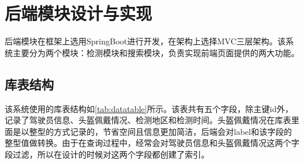 

\section{后端模块设计与实现}
后端模块在框架上选用SpringBoot进行开发，在架构上选择MVC三层架构。该系统主要分为两个模块：检测模块和搜索模块，负责实现前端页面提供的两大功能。

\subsection{库表结构}
该系统使用的库表结构如\ref{tab:datatable}所示。该表共有五个字段，除主键id外，记录了驾驶员信息、头盔佩戴情况、检测地区和检测时间。头盔佩戴情况在库表里面是以整型的方式记录的，节省空间且信息更加简洁，后端会对label和该字段的整型值做转换。由于在查询过程中，经常会对驾驶员信息和头盔佩戴情况这两个字段过滤，所以在设计的时候对这两个字段都创建了索引。

